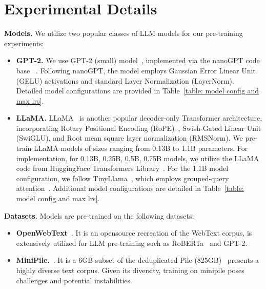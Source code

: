 
\vspace{1.cm}

\section{Experimental Details}
\label{sec:experimental_details}


{\bf Models.} We utilize two popular classes of LLM models for our pre-training experiments:
 \begin{itemize}[leftmargin=2em]
    \item {\bf GPT-2.} We use GPT-2 (small)  model~\citep{radford2019language}, implemented via the nanoGPT code base ~\citep{Karpathy2022}. 
    Following nanoGPT, the model employs Gaussian Error Linear Unit (GELU) activations and standard Layer Normalization (LayerNorm). Detailed model configurations are provided in Table~\ref{table: model config and max lrs}.
    
    \item {\bf LLaMA.} LLaMA~\citep{touvron2023LLaMA} is another popular decoder-only Transformer architecture, incorporating Rotary Positional Encoding (RoPE)~\citep{su2024roformer}, Swish-Gated Linear Unit (SwiGLU), and Root mean square layer normalization (RMSNorm). 
    We pre-train LLaMA models of sizes ranging from 0.13B to 1.1B parameters. 
    For implementation, for 0.13B, 0.25B, 0.5B, 0.75B models, we utilize the LLaMA code from HuggingFace Transformers Library~\citep{wolf-etal-2020-transformers}. For the 1.1B model configuration, we follow TinyLlama~\citep{zhang2024tinyllama}, which employs grouped-query attention~\citep{ainslie-etal-2023-gqa}. Additional model configurations are detailed in Table~\ref{table: model config and max lrs}.
\end{itemize}


{\bf Datasets.} Models are pre-trained on the following datasets:

\begin{itemize}[leftmargin=2em]
    \item {\bf OpenWebText}~\citep{Gokaslan2019OpenWeb}. It is an opensource recreation of the WebText corpus, is extensively utilized for LLM pre-training such as RoBERTa~\citep{liu2019roberta} and GPT-2. 
    \item {\bf MiniPile.}~\citep{kaddour2023minipile}. It is a 6GB subset of the deduplicated Pile (825GB)~\citep{gao2020pile} presents a highly diverse text corpus. Given its diversity, training on minipile poses challenges and potential instabilities.
\end{itemize}


